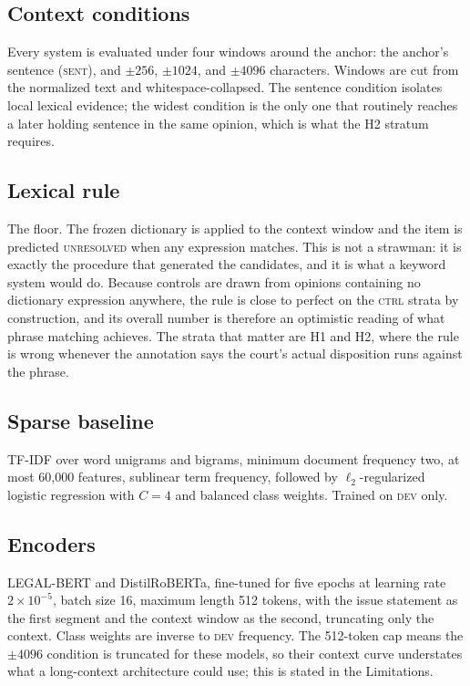 \subsection{Context conditions} Every system is evaluated under four windows
around the anchor: the anchor's sentence (\textsc{sent}), and $\pm256$,
$\pm1024$, and $\pm4096$ characters. Windows are cut from the normalized text and
whitespace-collapsed. The sentence condition isolates local lexical evidence; the
widest condition is the only one that routinely reaches a later holding sentence
in the same opinion, which is what the H2 stratum requires.

\subsection{Lexical rule} The floor. The frozen dictionary is applied to the
context window and the item is predicted \textsc{unresolved} when any expression
matches. This is not a strawman: it is exactly the procedure that generated the
candidates, and it is what a keyword system would do. Because controls are drawn
from opinions containing no dictionary expression anywhere, the rule is close to
perfect on the \textsc{ctrl} strata by construction, and its overall number is
therefore an optimistic reading of what phrase matching achieves. The strata that
matter are H1 and H2, where the rule is wrong whenever the annotation says the
court's actual disposition runs against the phrase.

\subsection{Sparse baseline} TF-IDF over word unigrams and bigrams, minimum
document frequency two, at most 60{,}000 features, sublinear term frequency,
followed by $\ell_2$-regularized logistic regression with $C=4$ and balanced
class weights. Trained on \textsc{dev} only.

\subsection{Encoders} LEGAL-BERT \citep{chalkidis2020legalbert} and
DistilRoBERTa, fine-tuned for five epochs at learning rate $2\times10^{-5}$,
batch size 16, maximum length 512 tokens, with the issue statement as the first
segment and the context window as the second, truncating only the context.
Class weights are inverse to \textsc{dev} frequency. The 512-token cap means the
$\pm4096$ condition is truncated for these models, so their context curve
understates what a long-context architecture could use; this is stated in the
Limitations.

